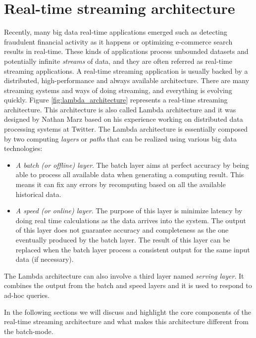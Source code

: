 \section{Real-time streaming architecture}
Recently, many big data real-time applications emerged such as detecting fraudulent financial activity as it happens or optimizing e-commerce search results in real-time. These kinds of applications process unbounded datasets and potentially infinite \emph{streams} of data, and they are often  referred as real-time streaming applications. A real-time streaming application is usually backed by a distributed, high-performance and always available architecture. There are many streaming systems and ways of doing streaming, and everything is evolving quickly. Figure \ref{fig:lambda_architecture} represents a real-time streaming architecture. This architecture is also called Lambda architecture \cite{fastdataarchitecture, lambdaarchitecturecosteffective, alljoynlambda} and it was designed by Nathan Marz based on his experience working on distributed data processing systems at Twitter. The Lambda architecture is essentially composed by two computing \emph{layers} or \emph{paths} that can be realized using various big data technologies:
\begin{itemize}
\item \emph{A batch (or offline) layer}. The batch layer aims at perfect accuracy by being able to process all available data when generating a computing result. This means it can fix any errors by recomputing based on all the available historical data.

\item \emph{A speed (or online) layer}. The purpose of this layer is minimize latency by doing real time calculations as the data arrives into the system. The output of this layer does not guarantee accuracy and completeness as the one eventually produced by the batch layer. The result of this layer can be replaced when the batch layer process a consistent output for the same input data (if necessary).
\end{itemize}

The Lambda architecture can also involve a third layer named \emph{serving layer}. It combines the output from the batch and speed layers and it is used to respond to ad-hoc queries.

In the following sections we will discuss and highlight the core components of the real-time streaming architecture and what makes this architecture different from the batch-mode.

